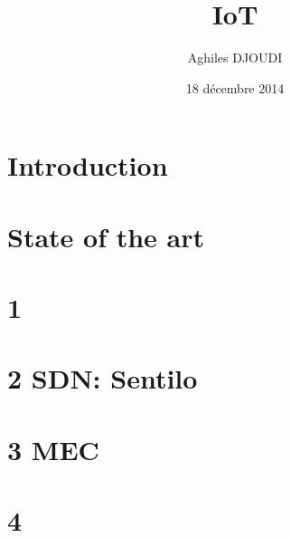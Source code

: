 \documentclass[a4paper, 12pt, twoside,openright]{report}
\title{IoT}
\author{Aghiles DJOUDI}
\date{18 décembre 2014}
\begin{document}
\preface
	
	
	
	
	
	
\body

% 
% 
% 
% 

\chapter{Introduction}
\minitoc
	

\chapter{State of the art \cite{bregell_hardware_2015}}
\minitoc
	
	
	
 	
 	

\chapter{1 \cite{bregell_hardware_2015}}
\minitoc
	
	
	
	
	
	
	

\chapter{2 SDN: Sentilo \cite{_contiki_2016a}}
\minitoc
	
	
	
	
	
	
	

\chapter{3 MEC}
\minitoc
	
	
	
	
	
	
	

\chapter{4}
\minitoc
	
	
	
	
	
	
	
\end{document}
